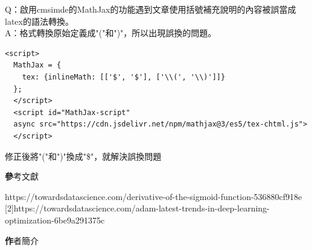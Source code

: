 \documentclass[14pt,a4paper]{report}  %
\begin{document}
\hspace{-1.7em} Q：啟用cmsimde的MathJax的功能遇到文章使用括號補充說明的內容被誤當成latex的語法轉換。\\
\hspace{-1.7em} A：格式轉換原始定義成"("和")"，所以出現誤換的問題。\\
\begin{lstlisting}[caption=\Large\sectionef MathJax 程式碼]
<script>
  MathJax = {
    tex: {inlineMath: [['$', '$'], ['\\(', '\\)']]}
  };
  </script>
  <script id="MathJax-script" 
  async src="https://cdn.jsdelivr.net/npm/mathjax@3/es5/tex-chtml.js"> 
  </script>
\end{lstlisting}

修正後將"("和")"換成"\$"，就解決誤換問題
\newpage
\begin{center}
\LARGE\textbf 參考文獻\\
\end{center}
\begin{flushleft}
\begin{Large}
[1]\quad https://towardsdatascience.com/derivative-of-the-sigmoid-function-536880cf918e\\

[2]\quad https://towardsdatascience.com/adam-latest-trends-in-deep-learning-optimization-6be9a291375c\\
\end{Large}
\end{flushleft}
\newpage
\begin{center}
\LARGE\textbf 作者簡介\\
\end{center}
\newpage
\pagestyle{empty}%
\end{document}
